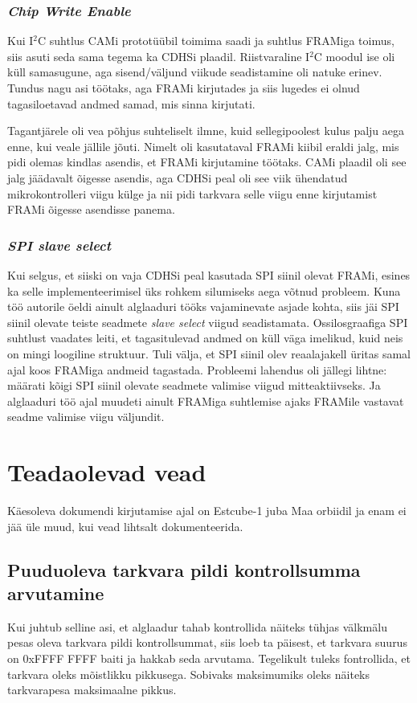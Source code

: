 \documentclass[12pt,a4paper]{article}
\newcommand{\iic}{I${}^2$C }
\begin{document}
\subsubsection{\textit{Chip Write Enable}}
Kui \iic suhtlus CAMi prototüübil toimima saadi ja suhtlus FRAMiga toimus, siis
asuti seda sama tegema ka CDHSi plaadil. Riistvaraline \iic moodul ise oli küll
samasugune, aga sisend/väljund viikude seadistamine oli natuke erinev. Tundus
nagu asi töötaks, aga FRAMi kirjutades ja siis lugedes ei olnud tagasiloetavad
andmed samad, mis sinna kirjutati.

Tagantjärele oli vea põhjus suhteliselt ilmne, kuid sellegipoolest kulus palju
aega enne, kui veale jällile jõuti. Nimelt oli kasutataval FRAMi kiibil eraldi
jalg, mis pidi olemas kindlas asendis, et FRAMi kirjutamine töötaks. CAMi
plaadil oli see jalg jäädavalt õigesse asendis, aga CDHSi peal oli see viik
ühendatud mikrokontrolleri viigu külge ja nii pidi tarkvara selle viigu enne
kirjutamist FRAMi õigesse asendisse panema.

\subsubsection{\textit{SPI slave select}}
Kui selgus, et siiski on vaja CDHSi peal kasutada SPI siinil olevat FRAMi,
esines ka selle implementeerimisel üks rohkem silumiseks aega võtnud probleem.
Kuna töö autorile öeldi ainult alglaaduri tööks vajaminevate asjade kohta, siis
jäi SPI siinil olevate teiste seadmete \textit{slave select} viigud
seadistamata. Ossilosgraafiga SPI suhtlust vaadates leiti, et tagasitulevad
andmed on küll väga imelikud, kuid neis on mingi loogiline struktuur. Tuli
välja, et SPI siinil olev reaalajakell üritas samal ajal koos FRAMiga andmeid
tagastada. Probleemi lahendus oli jällegi lihtne: määrati kõigi SPI siinil
olevate seadmete valimise viigud mitteaktiivseks. Ja alglaaduri töö ajal muudeti
ainult FRAMiga suhtlemise ajaks FRAMile vastavat seadme valimise viigu väljundit.

\section{Teadaolevad vead}
Käesoleva dokumendi kirjutamise ajal on Estcube-1 juba Maa orbiidil ja enam ei
jää üle muud, kui vead lihtsalt dokumenteerida.
\subsection{Puuduoleva tarkvara pildi kontrollsumma arvutamine}
Kui juhtub selline asi, et alglaadur tahab kontrollida näiteks tühjas välkmälu
pesas oleva tarkvara pildi kontrollsummat, siis loeb ta päisest, et tarkvara
suurus on 0xFFFF FFFF baiti ja hakkab seda arvutama. Tegelikult tuleks
fontrollida, et tarkvara oleks mõistlikku pikkusega. Sobivaks maksimumiks oleks
näiteks tarkvarapesa maksimaalne pikkus.
\end{document}
